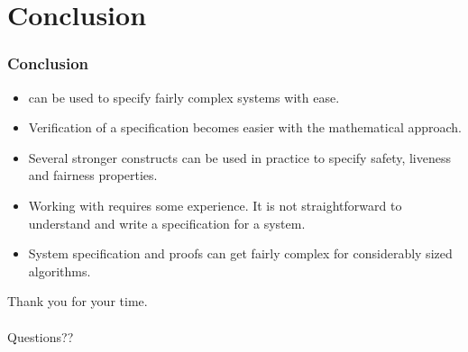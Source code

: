 \documentclass[xcolor=dvipsnames]{beamer}
\begin{document}
\section{Conclusion}
\begin{frame}
	\frametitle{Conclusion}
	\begin{itemize}
		\item \tla can be used to specify fairly complex systems with ease.
		\item Verification of a specification becomes easier with the mathematical approach.
		\item Several stronger constructs can be used in practice to specify safety, liveness and fairness properties.
		\item Working with \tla requires some experience. It is not straightforward to understand and write a specification for a system.
		\item System specification and proofs can get fairly complex for considerably sized algorithms.
	\end{itemize}
\end{frame}

\begin{frame}
	
\centering
Thank you for your time.\\~\\
Questions??
	
\end{frame}


\begin{frame}
	\nocite{*}
	
	
\end{frame} 
\end{document}
